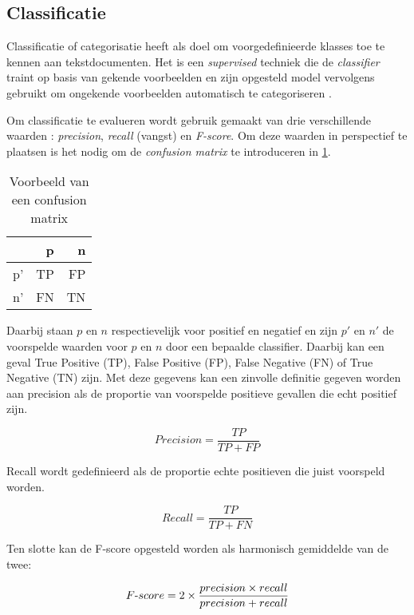 \subsection{Classificatie}\label{classificatie}
Classificatie of categorisatie heeft als doel om voorgedefinieerde klasses toe te kennen aan tekstdocumenten. Het is een \textit{supervised} techniek die de \textit{classifier} traint op basis van gekende voorbeelden en zijn opgesteld model vervolgens gebruikt om ongekende voorbeelden automatisch te categoriseren \cite{Nasa2012}.

Om classificatie te evalueren wordt gebruik gemaakt van drie verschillende waarden \cite{Powers2007}: \textit{precision}, \textit{recall} (vangst) en \textit{F-score}. Om deze waarden in perspectief te plaatsen is het nodig om de \textit{confusion matrix} te introduceren in \ref{tab:confusion}.

\begin{table}[htbp] \centering \caption{Voorbeeld van een confusion matrix} 
\centering
\begin{tabular}{rrr} \\
\toprule & p & n \\ 
\midrule 
p' & TP & FP \\ 
n' & FN & TN \\ 
\bottomrule 
\end{tabular} 
\label{tab:confusion}%
\end{table}%

Daarbij staan $p$ en $n$ respectievelijk voor positief en negatief en zijn $p'$ en $n'$ de voorspelde waarden voor $p$ en $n$ door een bepaalde classifier. Daarbij kan een geval True Positive (TP), False Positive (FP), False Negative (FN) of True Negative (TN) zijn. Met deze gegevens kan een zinvolle definitie gegeven worden aan precision als de proportie van voorspelde positieve gevallen die echt positief zijn.

\begin{equation}
Precision = \frac{TP}{TP + FP}
\end{equation}

Recall wordt gedefinieerd als de proportie echte positieven die juist voorspeld worden.

\begin{equation}
Recall = \frac{TP}{TP + FN}
\end{equation}

Ten slotte kan de F-score opgesteld worden als harmonisch gemiddelde van de twee:

\begin{equation}
\mathop{\mbox{$F$-$score$}} = 2 \times \frac{precision \times recall}{precision + recall}
\end{equation}


